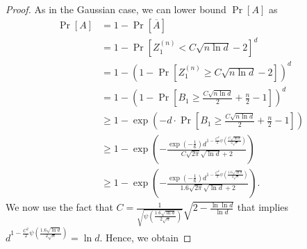 \documentclass{article}
\begin{document}
\begin{proof}
As in the Gaussian case, we can lower bound $\Pr[A]$ as
\begin{align*}
\Pr[A]
& = 1 - \Pr \left[ \overline{A} \right] \\
& = 1 - \Pr \left[ Z^{(n)}_1 < C \sqrt{n \ln d} - 2 \right]^d \\
& = 1 - \left(1 - \Pr\left[Z^{(n)}_1\ge C \sqrt{n \ln d}-2 \right] \right)^d \\
& = 1 - \left(1 - \Pr\left[B_1 \ge \frac{C \sqrt{n \ln d}}{2} +\frac{n}{2} - 1 \right] \right)^d \\
& \ge 1-\exp\left(-d \cdot \Pr \left[ B_1\ge \frac{C \sqrt{n \ln d}}{2} +\frac{n}{2}-1 \right] \right) \\
& \ge 1 - \exp\left(-\frac{\exp\left(-\frac{1}{6}\right) d^{1-\frac{C^2}{2} \psi\left(\frac{C \sqrt{\ln d}}{2 \sqrt{n}}\right)}}{C \sqrt{2\pi} \sqrt{\ln d}+2}\right) \\
& \ge 1 - \exp\left(-\frac{\exp\left(-\frac{1}{6}\right) d^{1-\frac{C^2}{2} \psi\left(\frac{1.6 \sqrt{\ln d}}{2 \sqrt{n}}\right)}}{1.6 \sqrt{2\pi} \sqrt{\ln d}+2}\right).
%
\end{align*}
We now use the fact that $C=\frac{1}{\sqrt{\psi\left(\frac{1.6 \sqrt{\ln d}}{2 \sqrt{n}}\right)}}\sqrt{2- \frac{\ln \ln d}{\ln d}}$ that implies $d^{1-\frac{C^2}{2} \psi\left(\frac{1.6 \sqrt{\ln d}}{2 \sqrt{n}}\right)}=\ln d$. Hence, we obtain

\end{proof}
\end{document}
